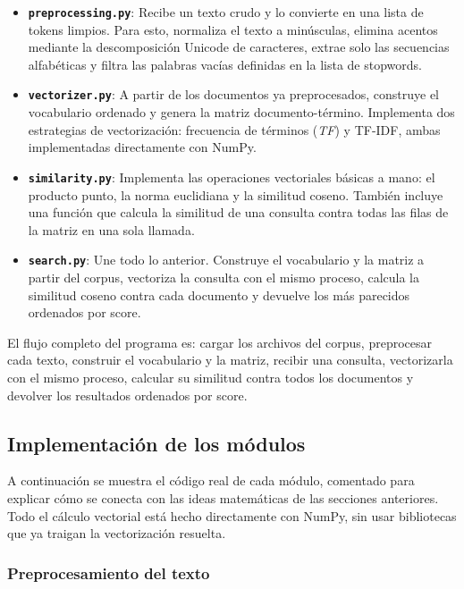 \documentclass[12pt,a4paper]{article}
\begin{document}
\begin{itemize}
    \item \textbf{\texttt{preprocessing.py}}: Recibe un texto crudo y lo convierte en una lista de tokens limpios. Para esto, normaliza el texto a minúsculas, elimina acentos mediante la descomposición Unicode de caracteres, extrae solo las secuencias alfabéticas y filtra las palabras vacías definidas en la lista de stopwords.

    \item \textbf{\texttt{vectorizer.py}}: A partir de los documentos ya preprocesados, construye el vocabulario ordenado y genera la matriz documento-término. Implementa dos estrategias de vectorización: frecuencia de términos (\textit{TF}) y TF-IDF, ambas implementadas directamente con NumPy.

    \item \textbf{\texttt{similarity.py}}: Implementa las operaciones vectoriales básicas a mano: el producto punto, la norma euclidiana y la similitud coseno. También incluye una función que calcula la similitud de una consulta contra todas las filas de la matriz en una sola llamada.

    \item \textbf{\texttt{search.py}}: Une todo lo anterior. Construye el vocabulario y la matriz a partir del corpus, vectoriza la consulta con el mismo proceso, calcula la similitud coseno contra cada documento y devuelve los más parecidos ordenados por score.
\end{itemize}

El flujo completo del programa es: cargar los archivos del corpus, preprocesar cada texto, construir el vocabulario y la matriz, recibir una consulta, vectorizarla con el mismo proceso, calcular su similitud contra todos los documentos y devolver los resultados ordenados por score.

\subsection{Implementación de los módulos}

A continuación se muestra el código real de cada módulo, comentado para explicar cómo se conecta con las ideas matemáticas de las secciones anteriores. Todo el cálculo vectorial está hecho directamente con NumPy, sin usar bibliotecas que ya traigan la vectorización resuelta.

\subsubsection{Preprocesamiento del texto}
\end{document}
